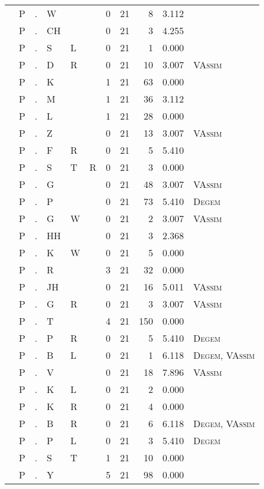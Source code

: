 \begin{longtable}{r@{ } r@{ } c@{ } l@{ } l@{ } l@{ } r r r r l }
 & P & . & W &  &  & 0 & 21 & 8 & 3.112 &  \\
 & P & . & CH &  &  & 0 & 21 & 3 & 4.255 &  \\
 & P & . & S & L &  & 0 & 21 & 1 & 0.000 &  \\
 & P & . & D & R &  & 0 & 21 & 10 & 3.007 & \textsc{VAssim} \\
 & P & . & K &  &  & 1 & 21 & 63 & 0.000 &  \\
 & P & . & M &  &  & 1 & 21 & 36 & 3.112 &  \\
 & P & . & L &  &  & 1 & 21 & 28 & 0.000 &  \\
 & P & . & Z &  &  & 0 & 21 & 13 & 3.007 & \textsc{VAssim} \\
 & P & . & F & R &  & 0 & 21 & 5 & 5.410 &  \\
 & P & . & S & T & R & 0 & 21 & 3 & 0.000 &  \\
 & P & . & G &  &  & 0 & 21 & 48 & 3.007 & \textsc{VAssim} \\
 & P & . & P &  &  & 0 & 21 & 73 & 5.410 & \textsc{Degem} \\
 & P & . & G & W &  & 0 & 21 & 2 & 3.007 & \textsc{VAssim} \\
 & P & . & HH &  &  & 0 & 21 & 3 & 2.368 &  \\
 & P & . & K & W &  & 0 & 21 & 5 & 0.000 &  \\
 & P & . & R &  &  & 3 & 21 & 32 & 0.000 &  \\
 & P & . & JH &  &  & 0 & 21 & 16 & 5.011 & \textsc{VAssim} \\
 & P & . & G & R &  & 0 & 21 & 3 & 3.007 & \textsc{VAssim} \\
 & P & . & T &  &  & 4 & 21 & 150 & 0.000 &  \\
 & P & . & P & R &  & 0 & 21 & 5 & 5.410 & \textsc{Degem} \\
 & P & . & B & L &  & 0 & 21 & 1 & 6.118 & \textsc{Degem}, \textsc{VAssim} \\
 & P & . & V &  &  & 0 & 21 & 18 & 7.896 & \textsc{VAssim} \\
 & P & . & K & L &  & 0 & 21 & 2 & 0.000 &  \\
 & P & . & K & R &  & 0 & 21 & 4 & 0.000 &  \\
 & P & . & B & R &  & 0 & 21 & 6 & 6.118 & \textsc{Degem}, \textsc{VAssim} \\
 & P & . & P & L &  & 0 & 21 & 3 & 5.410 & \textsc{Degem} \\
 & P & . & S & T &  & 1 & 21 & 10 & 0.000 &  \\
 & P & . & Y &  &  & 5 & 21 & 98 & 0.000 &  \\

\end{longtable}
